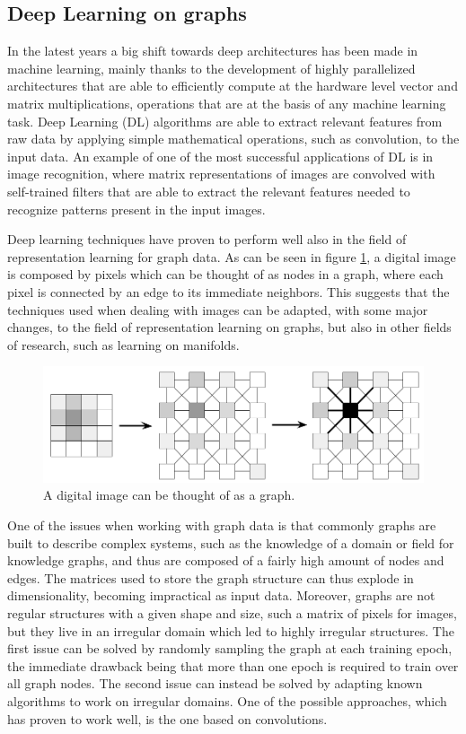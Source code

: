 \documentclass[%
    corpo=13.5pt,
    twoside,
    oldstyle,
    tipotesi=magistrale,
    greek,
    evenboxes
]{toptesi}
\begin{document}
\subsection{Deep Learning on graphs}

In the latest years a big shift towards deep architectures has been made
in machine learning, mainly thanks to the development of highly
parallelized architectures that are able to efficiently compute
at the hardware level vector and matrix multiplications, operations that
are at the basis of any machine learning task.
Deep Learning (DL) algorithms are able to extract relevant features from
raw data by applying simple mathematical operations, such as convolution, to
the input data.
An example of one of the most successful applications of DL is in
image recognition, where matrix representations of images are
convolved with self-trained filters that are able to
extract the relevant features needed to recognize patterns present
in the input images.

Deep learning techniques have proven to perform well also in the field of
representation learning for graph data.
As can be seen in figure \ref{fig:pixels-as-graph}, a digital image
is composed by pixels which can be thought of as nodes in a graph, where
each pixel is connected by an edge to its immediate neighbors. This suggests
that the techniques used when dealing with images can be adapted, with
some major changes, to the field of representation learning on graphs, but
also in other fields of research, such as learning on manifolds.

\begin{figure}[h]
    \centering
    \includegraphics[scale=0.4]{img/pixels-as-graph.png}
    \caption{A digital image can be thought of as a graph.}
    \label{fig:pixels-as-graph}
\end{figure}

One of the issues when working with graph data is that commonly graphs
are built to describe complex systems, such as the knowledge of a
domain or field for knowledge graphs, and thus are composed of
a fairly high amount of nodes and edges. The matrices used to
store the graph structure can thus explode in dimensionality, becoming
impractical as input data. Moreover, graphs are not
regular structures with a given shape and size, such a matrix of pixels
for images, but they live in an irregular domain which led to highly
irregular structures.
The first issue can be solved by randomly sampling the graph at each
training epoch, the immediate drawback being that more than one epoch
is required to train over all graph nodes. The second issue can instead be
solved by adapting known algorithms to work on irregular domains.
One of the possible approaches, which has proven to work well, is
the one based on convolutions.
\end{document}
